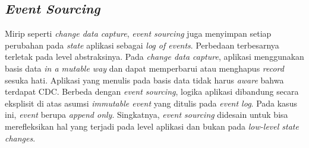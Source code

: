 \subsection{\textit{Event Sourcing}}

Mirip seperti \textit{change data capture}, \textit{event sourcing} juga menyimpan setiap perubahan pada \textit{state} aplikasi sebagai \textit{log of events}. Perbedaan terbesarnya terletak pada level abstraksinya. Pada \textit{change data capture}, aplikasi menggunakan basis data \textit{in a mutable way} dan dapat memperbarui atau menghapus \textit{record} sesuka hati. Aplikasi yang menulis pada basis data tidak harus \textit{aware} bahwa terdapat CDC. Berbeda dengan \textit{event sourcing}, logika aplikasi dibandung secara eksplisit di atas asumsi \textit{immutable event} yang ditulis pada \textit{event log}. Pada kasus ini, \textit{event} berupa \textit{append only}. Singkatnya, \textit{event sourcing} didesain untuk bisa merefleksikan hal yang terjadi pada level aplikasi dan bukan pada \textit{low-level state changes}.